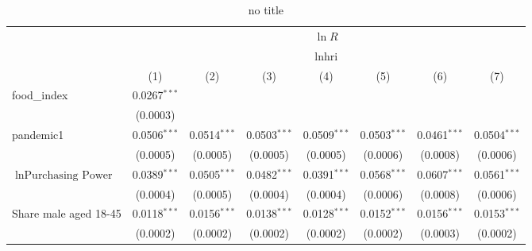 
\begin{table}[htbp]
   \centering
   \begin{threeparttable}[b]
      \caption{no title}
      \bigskip
      \begin{tabular}{lccccccc}
         \toprule
          & \multicolumn{7}{c}{$\ln R$}\\
          & \multicolumn{7}{c}{lnhri} \\ 
                                                    & (1)                     & (2)                     & (3)                     & (4)                    & (5)                     & (6)                     & (7)\\  
         \midrule 
         food\_index                                & 0.0267$^{***}$          &                         &                         &                        &                         &                         &   \\   
                                                    & (0.0003)                &                         &                         &                        &                         &                         &   \\   
         pandemic1                                  & 0.0506$^{***}$          & 0.0514$^{***}$          & 0.0503$^{***}$          & 0.0509$^{***}$         & 0.0503$^{***}$          & 0.0461$^{***}$          & 0.0504$^{***}$\\   
                                                    & (0.0005)                & (0.0005)                & (0.0005)                & (0.0005)               & (0.0006)                & (0.0008)                & (0.0006)\\   
         $\ln \text{Purchasing Power}$              & 0.0389$^{***}$          & 0.0505$^{***}$          & 0.0482$^{***}$          & 0.0391$^{***}$         & 0.0568$^{***}$          & 0.0607$^{***}$          & 0.0561$^{***}$\\   
                                                    & (0.0004)                & (0.0005)                & (0.0004)                & (0.0004)               & (0.0006)                & (0.0008)                & (0.0006)\\   
         Share male aged 18-45                      & 0.0118$^{***}$          & 0.0156$^{***}$          & 0.0138$^{***}$          & 0.0128$^{***}$         & 0.0152$^{***}$          & 0.0156$^{***}$          & 0.0153$^{***}$\\   
                                                    & (0.0002)                & (0.0002)                & (0.0002)                & (0.0002)               & (0.0002)                & (0.0003)                & (0.0002)\\   

\end{tabular}
\end{threeparttable}
\end{table}
